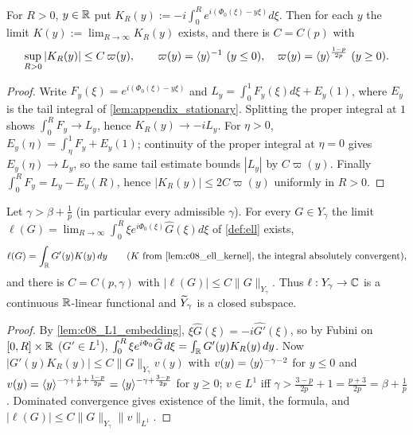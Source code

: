 \begin{lemma}
  \label{lem:c08_ell_kernel}
  For $R>0$, $y\in\mathbb{R}$ put $K_R(y):=-i\int_0^Re^{i(\Phi_0(\xi)-y\xi)}d\xi$. Then for each $y$ the limit
  $K(y):=\lim_{R\to\infty}K_R(y)$ exists, and there is $C=C(p)$ with
  \[
    \sup_{R>0}|K_R(y)|\le C\,\varpi(y),\qquad \varpi(y)=\langle y \rangle^{-1}\ (y\le0),\quad \varpi(y)=\langle y \rangle^{\frac{1-p}{2p}}\ (y\ge0).
  \]
\end{lemma}
\begin{proof}
  Write $F_y(\xi)=e^{i(\Phi_0(\xi)-y\xi)}$ and
  $L_y=\int_0^1F_y(\xi)d\xi+E_y(1)$, where $E_y$ is the tail integral of
  \cref{lem:appendix_stationary}. Splitting the proper integral at $1$ shows
  $\int_0^R F_y\to L_y$, hence $K_R(y)\to-iL_y$. For $\eta>0$,
  $E_y(\eta)=\int_\eta^1 F_y+E_y(1)$; continuity of the proper integral at $\eta=0$
  gives $E_y(\eta)\to L_y$, so the same tail estimate bounds $|L_y|$ by $C\varpi(y)$.
  Finally $\int_0^R F_y=L_y-E_y(R)$, hence $|K_R(y)|\le2C\varpi(y)$ uniformly in $R>0$.
\end{proof}

\begin{proposition}
  \label{prop:linear_ell_continuity}
  Let $\gamma>\beta+\frac1p$ (in particular every admissible $\gamma$). For every $G\in Y_\gamma$ the limit
  $\ell(G)=\lim_{R\to\infty}\int_0^R\xi e^{i\Phi_0(\xi)}\widehat G(\xi)d\xi$ of \cref{def:ell} exists,
  \[
    \ell(G)=\int_\R G'(y)K(y)\,dy\qquad(K\text{ from \cref{lem:c08_ell_kernel}, the integral absolutely convergent}),
  \]
  and there is $C=C(p,\gamma)$ with $|\ell(G)|\le C\|G\|_{Y_\gamma}$. Thus $\ell:Y_\gamma\to\mathbb{C}$ is a continuous $\mathbb{R}$-linear functional
  and $\widetilde{Y}_\gamma$ is a closed subspace.
\end{proposition}
\begin{proof}
  By \cref{lem:c08_L1_embedding}, $\xi\widehat G(\xi)=-i\widehat{G'}(\xi)$, so by Fubini on $[0,R]\times\mathbb{R}$ ($G'\in L^1$),
  $\int_0^R\xi e^{i\Phi_0}\widehat G\,d\xi=\int_{\mathbb{R}} G'(y)K_R(y)\,dy$. Now $|G'(y)K_R(y)|\le C\|G\|_{Y_\gamma}v(y)$ with
  $v(y)=\langle y \rangle^{-\gamma-2}$ for $y\le0$ and $v(y)=\langle y \rangle^{-\gamma+\frac1p+\frac{1-p}{2p}}=\langle y \rangle^{-\gamma+\frac{3-p}{2p}}$ for $y\ge0$; $v\in L^1$ iff
  $\gamma>\frac{3-p}{2p}+1=\frac{p+3}{2p}=\beta+\frac1p$. Dominated convergence gives existence of the limit, the formula, and
  $|\ell(G)|\le C\|G\|_{Y_\gamma}\|v\|_{L^1}$.
\end{proof}

